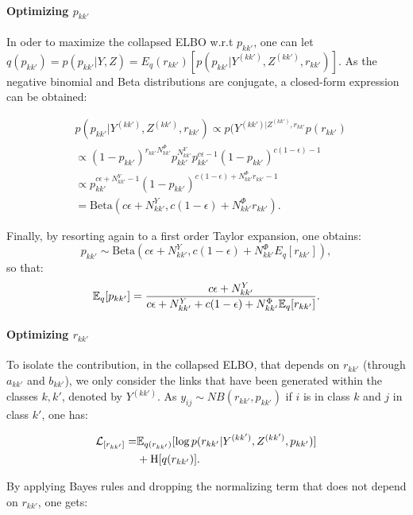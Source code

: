 \paragraph{Optimizing $p_{kk'}$}

In oder to maximize the collapsed ELBO w.r.t $p_{kk'}$, one can let $q(p_{kk'}) = p(p_{kk'} | Y,Z) = E_q(r_{kk'}) [ p(p_{kk'} | Y^{(kk')},Z^{(kk')} ,r_{kk'})]$. As the negative binomial and Beta distributions are conjugate, a closed-form expression can be obtained:

\begin{align*}
& p(p_{kk'} | Y^{(kk')}, Z^{(kk')}, r_{kk'}) \propto p(Y^{(kk')| Z^{(kk')}, r_{kk'}} p(r_{kk'}) \\
& \propto (1-p_{kk'})^{r_{kk'} N^\Phi_{kk'}}p_{kk'}^{N^Y_{kk'}} p_{kk'}^{c\epsilon -1} (1-p_{kk'})^{c(1-\epsilon) -1} \\
& \propto p_{kk'}^{c\epsilon + N^Y_{kk'} -1} (1-p_{kk'})^{c(1-\epsilon) + N^\Phi_{kk'}r_{kk'}-1} \\
& = \mathrm{Beta}(c\epsilon + N^Y_{kk'}, c(1-\epsilon) + N^\Phi_{kk'}r_{kk'}).
\end{align*}

Finally, by resorting again to a first order Taylor expansion, one obtains:
%
\begin{equation*}
p_{kk'} \sim \mathrm{Beta}(c\epsilon + N^Y_{kk'}, c(1-\epsilon) + N^\Phi_{kk'} E_q[r_{kk'}]), \nonumber
\end{equation*}
%
so that:
%
\[
\mathbb{E}_{q}[p_{kk'}] = \frac{c\epsilon + N^Y_{kk'}}{c\epsilon + N^Y_{kk'} + c(1-\epsilon) + N^\Phi_{kk'}\mathbb{E}_{q}[r_{kk'}]}.
\]
%

\paragraph{Optimizing $r_{kk'}$}

To isolate the contribution, in the collapsed ELBO, that depends on $r_{kk'}$ (through $a_{kk'}$ and $b_{kk'}$), we only consider the links that have been generated within the classes $k,k'$, denoted by $Y^{(kk')}$. As $y_{ij} \sim NB(r_{kk'}, p_{kk'})$ if $i$ is in class $k$ and $j$ in class $k'$, one has:

\begin{align*}
\mathcal{L}_{[r_{kk'}]} = & \mathbb{E}_{q(r_{kk'})}[\log p(r_{kk'}|Y^{(kk')},Z^{(kk')},p_{kk'})] \\
& + \textrm{H}[q(r_{kk'})].
\end{align*}

By applying Bayes rules and dropping the normalizing term that does not depend on $r_{kk'}$, one gets:

